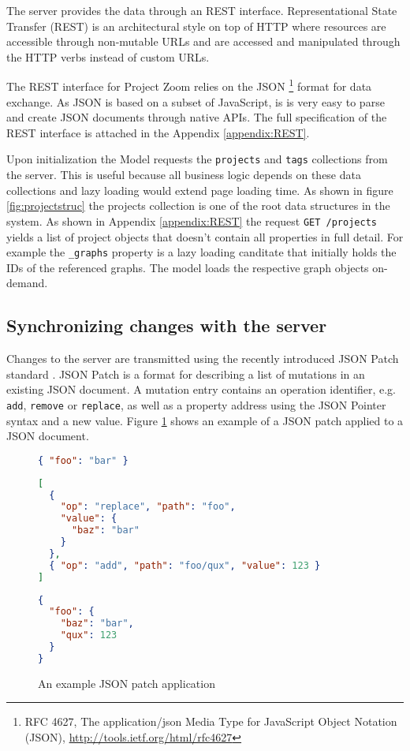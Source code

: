 The server provides the data through an REST interface. Representational State Transfer (REST) is an architectural style on top of HTTP where resources are accessible through non-mutable URLs and are accessed and manipulated through the HTTP verbs instead of custom URLs. \cite{Fielding_2000} 

The REST interface for Project Zoom relies on the JSON \footnote{RFC 4627,  The application/json Media Type for JavaScript Object Notation (JSON), \url{http://tools.ietf.org/html/rfc4627}} format for data exchange. As JSON is based on a subset of JavaScript, is is very easy to parse and create JSON documents through native APIs. The full specification of the REST interface is attached in the Appendix  \ref{appendix:REST}.

Upon initialization the Model requests the \texttt{projects} and \texttt{tags} collections from the server. This is useful because all business logic depends on these data collections and lazy loading would extend page loading time. As shown in figure \ref{fig:projectstruc} the projects collection is one of the root data structures in the system. As shown in Appendix \ref{appendix:REST} the request \texttt{GET /projects} yields a list of project objects that doesn't contain all properties in full detail. For example the \texttt{\_graphs} property is a lazy loading canditate that initially holds the IDs of the referenced graphs. The model loads the respective graph objects on-demand.


\subsection{Synchronizing changes with the server}

Changes to the server are transmitted using the recently introduced JSON Patch standard \cite{RFC6902}. JSON Patch is a format for describing a list of mutations in an existing JSON document. A mutation entry contains an operation identifier, e.g. \texttt{add}, \texttt{remove} or \texttt{replace}, as well as a property address using the JSON Pointer syntax and a new value. Figure \ref{fig:jsonpatch} shows an example of a JSON patch applied to a JSON document.

\begin{figure}
\begin{lstlisting}[language=json,caption=Initial JSON document]
{ "foo": "bar" }
\end{lstlisting}

\begin{lstlisting}[language=json,caption=JSON patch]
[
  { 
    "op": "replace", "path": "foo",
    "value": {
      "baz": "bar"
    }
  },
  { "op": "add", "path": "foo/qux", "value": 123 }
]
\end{lstlisting}

\begin{lstlisting}[language=json,caption=Resulting JSON document]
{
  "foo": {
    "baz": "bar",
    "qux": 123
  }
}
\end{lstlisting}

\caption{An example JSON patch application}
\label{fig:jsonpatch}
\end{figure}


